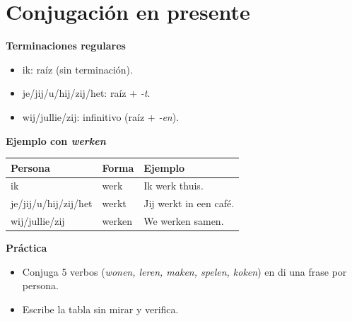 \section{Conjugación en presente}
\textbf{Terminaciones regulares}
\begin{itemize}[leftmargin=*]
  \item ik: raíz (sin terminación).
  \item je/jij/u/hij/zij/het: raíz + \textit{-t}.
  \item wij/jullie/zij: infinitivo (raíz + \textit{-en}).
\end{itemize}

\textbf{Ejemplo con \textit{werken}}
\begin{center}
\begin{tabular}{lll}
\toprule
Persona & Forma & Ejemplo \\
\midrule
ik & werk & Ik werk thuis. \\
je/jij/u/hij/zij/het & werkt & Jij werkt in een café. \\
wij/jullie/zij & werken & We werken samen. \\
\bottomrule
\end{tabular}
\end{center}

\textbf{Práctica}
\begin{itemize}[leftmargin=*]
  \item Conjuga 5 verbos (\textit{wonen, leren, maken, spelen, koken}) en di una frase por persona.
  \item Escribe la tabla sin mirar y verifica.
\end{itemize}
